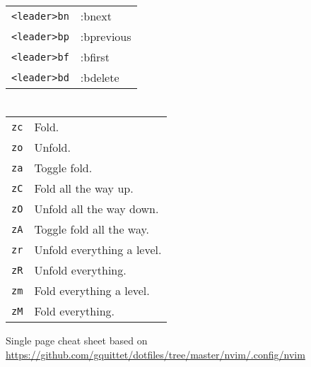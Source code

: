 \begin{multicols}{3}
\section{}
\begin{tabular}{@{}ll@{}}
	\verb!<leader>bn! & :bnext \\
	\verb!<leader>bp! & :bprevious \\
	\verb!<leader>bf! & :bfirst \\
	\verb!<leader>bd! & :bdelete \\
\end{tabular}

\section{}
\begin{tabular}{@{}ll@{}}
	\verb!zc! & Fold. \\
	\verb!zo! & Unfold. \\
	\verb!za! & Toggle fold. \\
	\verb!zC! & Fold all the way up. \\
	\verb!zO! & Unfold all the way down. \\
	\verb!zA! & Toggle fold all the way. \\
	\verb!zr! & Unfold everything a level.\\
	\verb!zR! & Unfold everything.\\
	\verb!zm! & Fold everything a level. \\
	\verb!zM! & Fold everything. \\
\end{tabular}

Single page cheat sheet based on \url{https://github.com/gquittet/dotfiles/tree/master/nvim/.config/nvim}

\end{multicols}

